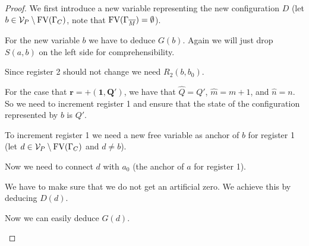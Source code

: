 \begin{proof}
	We first introduce a new variable representing the new configuration $D$ (let $b\in \mathcal{V}_P\setminus\text{FV}(\Gamma_C)$, note that $\text{FV}(\Gamma_{\overline{M}})=\emptyset$).
	
	\begin{figure}[H]
		\centering
		
	\end{figure}
	
	For the new variable $b$ we have to deduce $G(b)$. Again we will just drop $S(a,b)$ on the left side for comprehensibility.
	
	\begin{figure}[H]
		\centering
		
	\end{figure}
	
	Since register 2 should not change we need $R_2(b,b_0)$.
		
	\begin{figure}[H]
		\centering
		
	\end{figure}
	
	For the case that $\boldsymbol{r=+(1,Q')}$, we have that $\widehat{Q}=Q'$, $\widehat{m}=m+1$, and $\widehat{n}=n$. So we need to increment register 1 and ensure that the state of the configuration represented by $b$ is $Q'$.
	\begin{figure}[H]
		\centering
		
	\end{figure}
	
	To increment register 1 we need a new free variable as anchor of $b$ for register 1 (let $d\in\mathcal{V}_P\setminus\text{FV}(\Gamma_C)$ and $d\neq b$).
	
	\begin{figure}[H]
		\centering
		
	\end{figure}
	
	Now we need to connect $d$ with $a_0$ (the anchor of $a$ for register 1).
	
	\begin{figure}[H]
		\centering
		
	\end{figure}
	
	We have to make sure that we do not get an artificial zero. We achieve this by deducing $D(d)$.
	
	\begin{figure}[H]
		\centering
		
	\end{figure}
	
	Now we can easily deduce $G(d)$.
	
	\begin{figure}[H]
		\centering
		
	\end{figure}
	

\end{proof}
